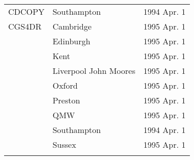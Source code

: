 \begin{table}
\begin{center}
\begin{tabular}{|p{36mm}|p{50mm}|p{30mm}|}
CDCOPY                  & Southampton      & 1994 Apr. 1 \\
CGS4DR                  & Cambridge        & 1995 Apr. 1 \\
                        & Edinburgh        & 1995 Apr. 1 \\
                        & Kent             & 1995 Apr. 1 \\
                        & Liverpool John Moores & 1995 Apr. 1 \\
                        & Oxford           & 1995 Apr. 1 \\
                        & Preston          & 1995 Apr. 1 \\
                        & QMW              & 1995 Apr. 1 \\
                        & Southampton      & 1994 Apr. 1 \\
                        & Sussex           & 1995 Apr. 1 \\
& & \\ \hline
\end{tabular}
\end{center}
\end{table}


